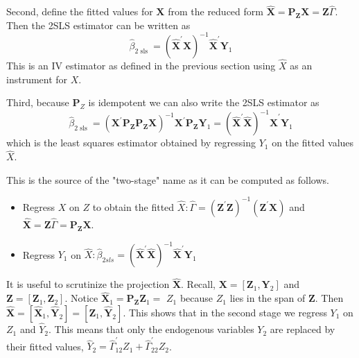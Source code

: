 \documentclass[10pt]{article}
\begin{document}
Second, define the fitted values for $\boldsymbol{X}$ from the reduced form $\widehat{\boldsymbol{X}}=\boldsymbol{P}_{\boldsymbol{Z}} \boldsymbol{X}=\boldsymbol{Z} \widehat{\Gamma}$. Then the 2SLS estimator can be written as
$$
\widehat{\beta}_{2 \text { sls }}=\left(\widehat{\boldsymbol{X}}^{\prime} \boldsymbol{X}\right)^{-1} \widehat{\boldsymbol{X}}^{\prime} \boldsymbol{Y}_{1}
$$
This is an IV estimator as defined in the previous section using $\widehat{X}$ as an instrument for $X$.

Third, because $\boldsymbol{P}_{Z}$ is idempotent we can also write the 2SLS estimator as
$$
\widehat{\beta}_{2 \text { sls }}=\left(\boldsymbol{X}^{\prime} \boldsymbol{P}_{\boldsymbol{Z}} \boldsymbol{P}_{\boldsymbol{Z}} \boldsymbol{X}\right)^{-1} \boldsymbol{X}^{\prime} \boldsymbol{P}_{\boldsymbol{Z}} \boldsymbol{Y}_{1}=\left(\widehat{\boldsymbol{X}}^{\prime} \widehat{\boldsymbol{X}}\right)^{-1} \widehat{\boldsymbol{X}}^{\prime} \boldsymbol{Y}_{1}
$$
which is the least squares estimator obtained by regressing $Y_{1}$ on the fitted values $\widehat{X}$.

This is the source of the "two-stage" name as it can be computed as follows.

\begin{itemize}
  \item Regress $X$ on $Z$ to obtain the fitted $\widehat{X}: \widehat{\Gamma}=\left(\boldsymbol{Z}^{\prime} \boldsymbol{Z}\right)^{-1}\left(\boldsymbol{Z}^{\prime} \boldsymbol{X}\right)$ and $\widehat{\boldsymbol{X}}=\boldsymbol{Z} \widehat{\Gamma}=\boldsymbol{P}_{\boldsymbol{Z}} \boldsymbol{X}$.

  \item Regress $Y_{1}$ on $\widehat{X}: \widehat{\beta}_{2 s l s}=\left(\widehat{\boldsymbol{X}}^{\prime} \widehat{\boldsymbol{X}}\right)^{-1} \widehat{\boldsymbol{X}}^{\prime} \boldsymbol{Y}_{1}$

\end{itemize}
It is useful to scrutinize the projection $\widehat{\boldsymbol{X}}$. Recall, $\boldsymbol{X}=\left[\boldsymbol{Z}_{1}, \boldsymbol{Y}_{2}\right]$ and $\boldsymbol{Z}=\left[\boldsymbol{Z}_{1}, \boldsymbol{Z}_{2}\right]$. Notice $\widehat{\boldsymbol{X}}_{1}=\boldsymbol{P}_{\boldsymbol{Z}} \boldsymbol{Z}_{1}=$ $Z_{1}$ because $Z_{1}$ lies in the span of $\boldsymbol{Z}$. Then $\widehat{\boldsymbol{X}}=\left[\widehat{\boldsymbol{X}}_{1}, \widehat{\boldsymbol{Y}}_{2}\right]=\left[\boldsymbol{Z}_{1}, \widehat{\boldsymbol{Y}}_{2}\right]$. This shows that in the second stage we regress $Y_{1}$ on $Z_{1}$ and $\widehat{Y}_{2}$. This means that only the endogenous variables $Y_{2}$ are replaced by their fitted values, $\widehat{Y}_{2}=\widehat{\Gamma}_{12}^{\prime} Z_{1}+\widehat{\Gamma}_{22}^{\prime} Z_{2}$.
\end{document}
